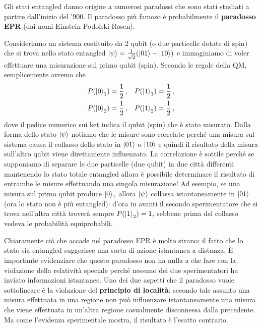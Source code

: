 \noindent Gli stati entangled danno origine a numerosi paradossi che sono stati studiati a partire dall'inizio del '900. Il paradosso più famoso è probabilmente il \textbf{paradosso EPR} (dai nomi Einstein-Podolski-Rosen). 
\begin{esempio}
    Consideriamo un sistema costituito da 2 qubit (o due particelle dotate di spin) che si trova nello stato entangled $\ket{\psi} = \frac{1}{\sqrt{2}} (\ket{01} - \ket{10})$ e immaginiamo di voler effettuare una misurazione sul primo qubit (spin). Secondo le regole della QM, semplicemente avremo che
    \begin{align*}
        P(\ket{0}_1) &= \frac{1}{2} \, , &P(\ket{1}_1) &= \frac{1}{2} \, , \\
        P(\ket{0}_2) &= \frac{1}{2} \, , &P(\ket{1}_2) &= \frac{1}{2} \, ,
    \end{align*}
    dove il pedice numerico sui ket indica il qubit (spin) che è stato misurato. Dalla forma dello stato $\ket{\psi}$ notiamo che le misure sono correlate perché una misura sul sistema causa il collasso dello stato in $\ket{01}$ o $\ket{10}$ e quindi il risultato della misura sull'altro qubit viene direttamente influenzato. La correlazione è sottile perché se supponiamo di separare le due particelle (due qubit) in due città differenti mantenendo lo stato totale entangled allora è possibile determinare il risultato di entrambe le misure effettuando una singola misurazione! Ad esempio, se una misura sul primo qubit produce $\ket{0}_1$ allora $\ket{\psi}$ collassa istantaneamente in $\ket{01}$ (ora lo stato non è più entangled): d'ora in avanti il secondo sperimentatore che si trova nell'altra città troverà sempre $P(\ket{1}_2) = 1$, sebbene prima del collasso vedeva le probabilità equiprobabili.
\end{esempio}

\noindent Chiaramente ciò che accade nel paradosso EPR è molto strano: il fatto che lo stato sia entangled suggerisce una sorta di azione istantanea a distanza. È importante evidenziare che questo paradosso non ha nulla a che fare con la violazione della relatività speciale perché nessuno dei due sperimentatori ha inviato informazioni istantanee. Uno dei due aspetti che il paradosso vuole sottolineare è la violazione del \textbf{principio di località}: secondo tale assunto una misura effettuata in una regione non può influenzare istantaneamente una misura che viene effettuata in un'altra regione casualmente disconnessa dalla precedente. Ma come l'evidenza sperimentale mostra, il risultato è l'esatto contrario.